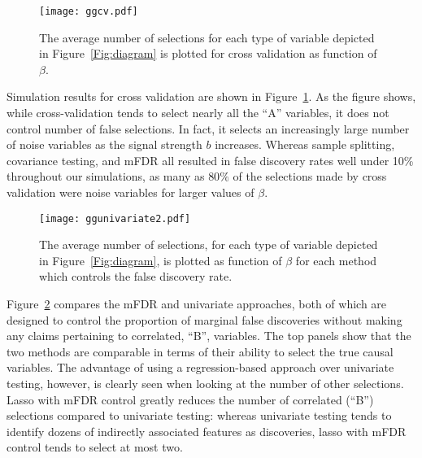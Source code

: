 
\begin{figure} [!htb]
 \centering
  \texttt{[image: ggcv.pdf]}
  \caption{\label{Fig:cv} The average number of selections for each type of variable depicted in Figure~\ref{Fig:diagram} is plotted for cross validation as function of $\beta$.}
\end{figure}


Simulation results for cross validation are shown in Figure~\ref{Fig:cv}.  As the figure shows, while cross-validation tends to select nearly all the ``A'' variables, it does not control number of false selections.  In fact, it selects an increasingly large number of noise variables as the signal strength $b$ increases. Whereas sample splitting, covariance testing, and mFDR all resulted in false discovery rates well under 10\% throughout our simulations, as many as $80\%$ of the selections made by cross validation were noise variables for larger values of $\beta$.


\begin{figure} [!htb]
 \centering
  \texttt{[image: ggunivariate2.pdf]}
  \caption{\label{Fig:univariate} The average number of selections, for each type of variable depicted in Figure~\ref{Fig:diagram}, is plotted as function of $\beta$ for each method which controls the false discovery rate.}
\end{figure}

Figure~\ref{Fig:univariate} compares the mFDR and univariate approaches, both of which are designed to control the proportion of marginal false discoveries without making any claims pertaining to correlated, ``B'', variables. The top panels show that the two methods are comparable in terms of their ability to select the true causal variables.  The advantage of using a regression-based approach over univariate testing, however, is clearly seen when looking at the number of other selections.  Lasso with mFDR control greatly reduces the number of correlated (``B'') selections compared to univariate testing: whereas univariate testing tends to identify dozens of indirectly associated features as discoveries, lasso with mFDR control tends to select at most two.

